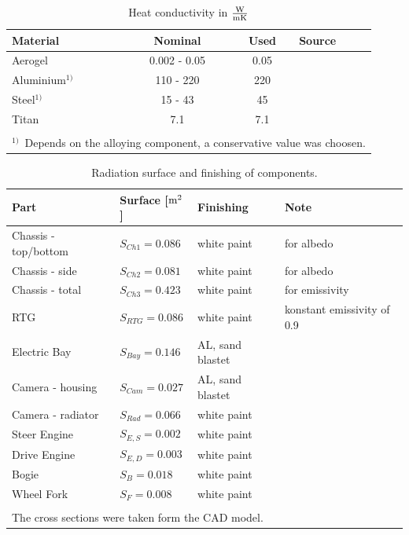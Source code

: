 \begin{table}[H]
	\centering
	\caption{Heat conductivity in $\frac{{\rm W}}{{\rm m} {\rm K}}$}
	\begin{tabular}{l@{\qquad\qquad}c@{\qquad\qquad}c@{\qquad\qquad}l}
		\toprule
		Material & Nominal & Used & Source \\ \midrule
		Aerogel & 0.002 - 0.05 & 0.05 & \cite{ref_tcs_03} \\
		Aluminium$^{1)}$  & 110 - 220 & 220 & \cite{ref_tcs_10} \cite{ref_tcs_11} \cite{ref_tcs_12} \\
		Steel$^{1)}$ & 15 - 43 & 45 & \cite{ref_tcs_08} \cite{ref_tcs_09} \\ 
		Titan  & 7.1  & 7.1 & \cite{ref_tcs_06} \cite{ref_tcs_07} \\\bottomrule
		&&&\\[-0.75em]
		\multicolumn{4}{l}{\small{$^{1)}$\  Depends on the alloying component, a conservative value was choosen.}}\\
	\end{tabular}
	\label{tab:tcs_conduct2}
\end{table}

\begin{table}[H]
	\centering
	\caption{Radiation surface and finishing of components.}
	\begin{tabular}{l@{\qquad}l@{\qquad}ll}
		\toprule
		Part  & Surface [${\rm m}^2$] & Finishing & Note \\ \midrule
		Chassis - top/bottom & $S_{Ch1}=0.086$ &  white paint & for albedo\\
		Chassis - side & $S_{Ch2}=0.081$ &  white paint & for albedo\\
		Chassis - total & $S_{Ch3}=0.423$ &  white paint & for emissivity\\
		RTG& $S_{RTG}=0.086$ & white paint & konstant emissivity of 0.9\\
		Electric Bay& $S_{Bay}=0.146$ & AL, sand blastet & \\
		Camera - housing & $S_{Cam}=0.027$ & AL, sand blastet &\\
		Camera - radiator & $S_{Rad}=0.066$ & white paint &  \\
		Steer Engine& $S_{E,S}=0.002$ & white paint& \\
		Drive Engine& $S_{E,D}=0.003$ &white paint & \\
		Bogie & $S_{B}=0.018$ &white paint & \\
		Wheel Fork& $S_{F}=0.008$ &white paint & \\ \bottomrule
		&&& \\
		\multicolumn{3}{l}{The cross sections were taken form the CAD model.}
	\end{tabular}
	\label{tab:tcs_surf}
\end{table}

